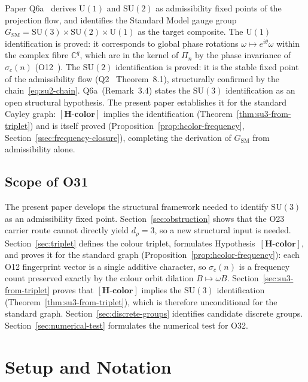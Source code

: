 \documentclass[11pt,a4paper]{article}
\theoremstyle{definition}
\theoremstyle{remark}
\newcommand{\SU}{\mathrm{SU}}
\newcommand{\dr}{d_{\rho}}
\newcommand{\Hcolor}{\mathbf{[H\text{-}color]}}
\newcommand{\C}{\mathbb{C}}
\begin{document}
      Paper Q6a~\cite{Beau2026q6a} derives $\mathrm{U}(1)$ and $\SU(2)$ as admissibility fixed
      points of the projection flow, and identifies the Standard Model gauge group
      $G_{\mathrm{SM}} = \SU(3) \times \SU(2) \times \mathrm{U}(1)$ as the target composite.
      The $\mathrm{U}(1)$ identification is proved: it corresponds to global phase rotations
      $\omega \mapsto e^{i\theta}\omega$ within the complex fibre $\C^q$, which are in the kernel of
      $\Pi_n$ by the phase invariance of $\sigma_c(n)$ (O12~\cite{Beau2026a12}).
      The $\SU(2)$ identification is proved: it is the stable fixed point of the admissibility flow
      (Q2~\cite{Beau2026q2} Theorem~8.1), structurally confirmed by the chain~\eqref{eq:su2-chain}.
      Q6a~(Remark~3.4) states the $\SU(3)$ identification as an open structural hypothesis.
      The present paper establishes it for the standard Cayley graph: $\Hcolor$ implies the
      identification (Theorem~\ref{thm:su3-from-triplet}) and is itself proved
      (Proposition~\ref{prop:hcolor-frequency}, Section~\ref{ssec:frequency-closure}), completing the
      derivation of $G_{\mathrm{SM}}$ from admissibility alone.

    \subsection{Scope of O31}
      \label{ssec:scope}

      The present paper develops the structural framework needed to identify $\SU(3)$ as an
      admissibility fixed point.
      Section~\ref{sec:obstruction} shows that the O23 carrier route cannot directly yield
      $\dr = 3$, so a new structural input is needed.
      Section~\ref{sec:triplet} defines the colour triplet, formulates Hypothesis~$\Hcolor$, and
      proves it for the standard graph (Proposition~\ref{prop:hcolor-frequency}): each O12 fingerprint
      vector is a single additive character, so $\sigma_c(n)$ is a frequency count preserved exactly
      by the colour orbit dilation $B \mapsto \omega B$.
      Section~\ref{sec:su3-from-triplet} proves that $\Hcolor$ implies the $\SU(3)$ identification
      (Theorem~\ref{thm:su3-from-triplet}), which is therefore unconditional for the standard graph.
      Section~\ref{sec:discrete-groups} identifies candidate discrete groups.
      Section~\ref{sec:numerical-test} formulates the numerical test for O32.

  \section{Setup and Notation}
    \label{sec:setup}
\end{document}
